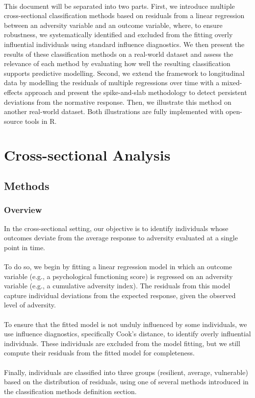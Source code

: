 \documentclass[12pt]{article}
\begin{document}
\\
This document will be separated into two parts. First, we introduce multiple cross-sectional classification methods based on residuals from a linear regression between an adversity variable and an outcome variable, where, to ensure robustness, we systematically identified and excluded from the fitting overly influential individuals using standard influence diagnostics. We then present the results of these classification methods on a real-world dataset and assess the relevance of each method by evaluating how well the resulting classification supports predictive modelling. Second, we extend the framework to longitudinal data by modelling the residuals of multiple regressions over time with a mixed-effects approach and present the spike-and-slab methodology to detect persistent deviations from the normative response. Then, we illustrate this method on another real-world dataset. Both illustrations are fully implemented with open-source tools in R.

\section{Cross-sectional Analysis}
\subsection{Methods}
\subsubsection{Overview}
In the cross-sectional setting, our objective is to identify individuals whose outcomes deviate from the average response to adversity evaluated at a single point in time.\\
\\
To do so, we begin by fitting a linear regression model in which an outcome variable (e.g., a psychological functioning score) is regressed on an adversity variable (e.g., a cumulative adversity index). The residuals from this model capture individual deviations from the expected response, given the observed level of adversity.\\
\\
To ensure that the fitted model is not unduly influenced by some individuals, we use influence diagnostics, specifically Cook's distance, to identify overly influential individuals. These individuals are excluded from the model fitting, but we still compute their residuals from the fitted model for completeness.\\
\\
Finally, individuals are classified into three groups (resilient, average, vulnerable) based on the distribution of residuals, using one of several methods introduced in the classification methods definition section.
\end{document}
